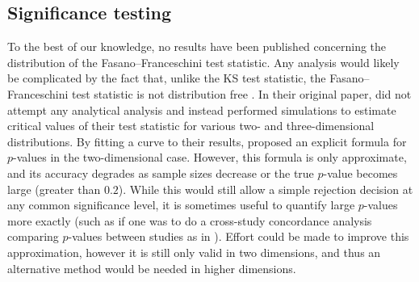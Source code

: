 
\subsection{Significance testing}
To the best of our knowledge, no results have been published concerning the distribution of the Fasano--Franceschini test statistic. Any analysis would likely be complicated by the fact that, unlike the KS test statistic, the Fasano--Franceschini test statistic is not distribution free \citep{ff1987}. In their original paper, \citet{ff1987} did not attempt any analytical analysis and instead performed simulations to estimate critical values of their test statistic for various two- and three-dimensional distributions. By fitting a curve to their results, \citet{press2007} proposed an explicit formula for $p$-values in the two-dimensional case. However, this formula is only approximate, and its accuracy degrades as sample sizes decrease or the true $p$-value becomes large (greater than $0.2$). While this would still allow a simple rejection decision at any common significance level, it is sometimes useful to quantify large $p$-values more exactly (such as if one was to do a cross-study concordance analysis comparing $p$-values between studies as in \citealt{ness-cohn_2020}). Effort could be made to improve this approximation, however it is still only valid in two dimensions, and thus an alternative method would be needed in higher dimensions.

